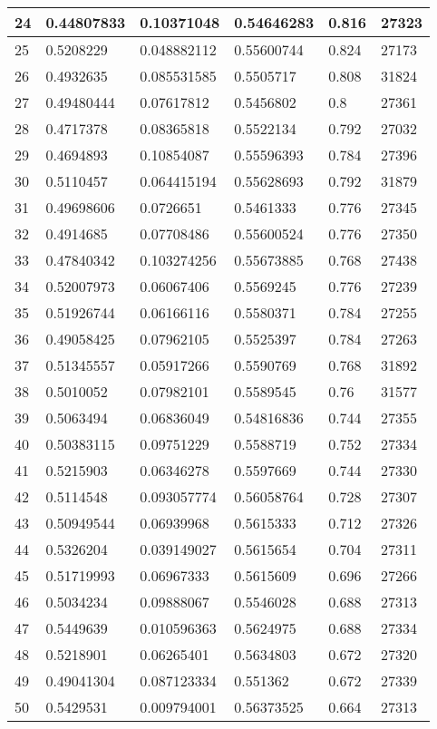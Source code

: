 \begin{longtable}{|l|l|l|l|l|l|}
24 & 0.44807833 & 0.10371048 & 0.54646283 & 0.816 & 27323 \\ \hline 
25 & 0.5208229 & 0.048882112 & 0.55600744 & 0.824 & 27173 \\ \hline 
26 & 0.4932635 & 0.085531585 & 0.5505717 & 0.808 & 31824 \\ \hline 
27 & 0.49480444 & 0.07617812 & 0.5456802 & 0.8 & 27361 \\ \hline 
28 & 0.4717378 & 0.08365818 & 0.5522134 & 0.792 & 27032 \\ \hline 
29 & 0.4694893 & 0.10854087 & 0.55596393 & 0.784 & 27396 \\ \hline 
30 & 0.5110457 & 0.064415194 & 0.55628693 & 0.792 & 31879 \\ \hline 
31 & 0.49698606 & 0.0726651 & 0.5461333 & 0.776 & 27345 \\ \hline 
32 & 0.4914685 & 0.07708486 & 0.55600524 & 0.776 & 27350 \\ \hline 
33 & 0.47840342 & 0.103274256 & 0.55673885 & 0.768 & 27438 \\ \hline 
34 & 0.52007973 & 0.06067406 & 0.5569245 & 0.776 & 27239 \\ \hline 
35 & 0.51926744 & 0.06166116 & 0.5580371 & 0.784 & 27255 \\ \hline 
36 & 0.49058425 & 0.07962105 & 0.5525397 & 0.784 & 27263 \\ \hline 
37 & 0.51345557 & 0.05917266 & 0.5590769 & 0.768 & 31892 \\ \hline 
38 & 0.5010052 & 0.07982101 & 0.5589545 & 0.76 & 31577 \\ \hline 
39 & 0.5063494 & 0.06836049 & 0.54816836 & 0.744 & 27355 \\ \hline 
40 & 0.50383115 & 0.09751229 & 0.5588719 & 0.752 & 27334 \\ \hline 
41 & 0.5215903 & 0.06346278 & 0.5597669 & 0.744 & 27330 \\ \hline 
42 & 0.5114548 & 0.093057774 & 0.56058764 & 0.728 & 27307 \\ \hline 
43 & 0.50949544 & 0.06939968 & 0.5615333 & 0.712 & 27326 \\ \hline 
44 & 0.5326204 & 0.039149027 & 0.5615654 & 0.704 & 27311 \\ \hline 
45 & 0.51719993 & 0.06967333 & 0.5615609 & 0.696 & 27266 \\ \hline 
46 & 0.5034234 & 0.09888067 & 0.5546028 & 0.688 & 27313 \\ \hline 
47 & 0.5449639 & 0.010596363 & 0.5624975 & 0.688 & 27334 \\ \hline 
48 & 0.5218901 & 0.06265401 & 0.5634803 & 0.672 & 27320 \\ \hline 
49 & 0.49041304 & 0.087123334 & 0.551362 & 0.672 & 27339 \\ \hline 
50 & 0.5429531 & 0.009794001 & 0.56373525 & 0.664 & 27313 \\ \hline 
\end{longtable}